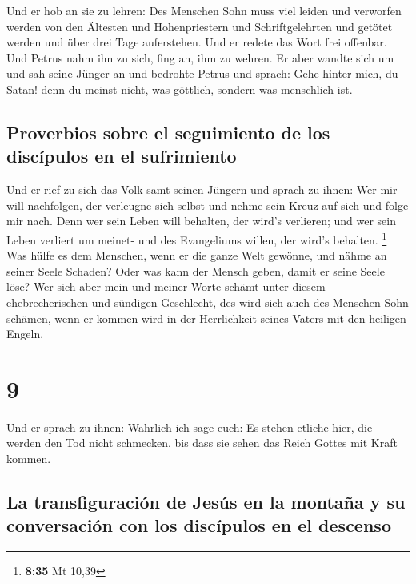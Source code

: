  Und er hob an sie zu lehren: Des Menschen Sohn muss viel
leiden und verworfen werden von den Ältesten und Hohenpriestern und
Schriftgelehrten und getötet werden und über drei Tage auferstehen.
 Und er redete das Wort frei offenbar. Und Petrus nahm
ihn zu sich, fing an, ihm zu wehren.  Er aber wandte sich
um und sah seine Jünger an und bedrohte Petrus und sprach: Gehe hinter
mich, du Satan! denn du meinst nicht, was göttlich, sondern was
menschlich ist.

\hypertarget{proverbios-sobre-el-seguimiento-de-los-discuxedpulos-en-el-sufrimiento}{%
\subsection{Proverbios sobre el seguimiento de los discípulos en el
sufrimiento}\label{proverbios-sobre-el-seguimiento-de-los-discuxedpulos-en-el-sufrimiento}}

 Und er rief zu sich das Volk samt seinen Jüngern und
sprach zu ihnen: Wer mir will nachfolgen, der verleugne sich selbst und
nehme sein Kreuz auf sich und folge mir nach.  Denn wer
sein Leben will behalten, der wird's verlieren; und wer sein Leben
verliert um meinet- und des Evangeliums willen, der wird's behalten.
\footnote{\textbf{8:35} Mt 10,39}  Was hülfe es dem
Menschen, wenn er die ganze Welt gewönne, und nähme an seiner Seele
Schaden?  Oder was kann der Mensch geben, damit er seine
Seele löse?  Wer sich aber mein und meiner Worte schämt
unter diesem ehebrecherischen und sündigen Geschlecht, des wird sich
auch des Menschen Sohn schämen, wenn er kommen wird in der Herrlichkeit
seines Vaters mit den heiligen Engeln.

\hypertarget{section-8}{%
\section{9}\label{section-8}}

 Und er sprach zu ihnen: Wahrlich ich sage euch: Es stehen
etliche hier, die werden den Tod nicht schmecken, bis dass sie sehen das
Reich Gottes mit Kraft kommen.

\hypertarget{la-transfiguraciuxf3n-de-jesuxfas-en-la-montauxf1a-y-su-conversaciuxf3n-con-los-discuxedpulos-en-el-descenso}{%
\subsection{La transfiguración de Jesús en la montaña y su conversación
con los discípulos en el
descenso}\label{la-transfiguraciuxf3n-de-jesuxfas-en-la-montauxf1a-y-su-conversaciuxf3n-con-los-discuxedpulos-en-el-descenso}}


